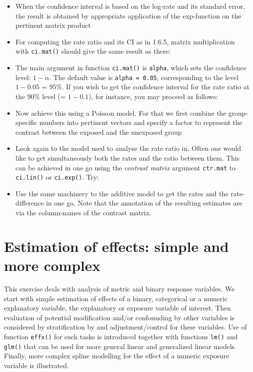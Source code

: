 \documentclass[
]{book}
\begin{document}
\begin{itemize}
\item
  When the confidence interval is based on the log-rate and its
  standard error, the result is obtained by appropriate application of
  the exp-function on the pertinent matrix product
\item
  For computing the rate ratio and its CI as in 1.6.5, matrix
  multiplication with \texttt{ci.mat()} should give the same result as
  there:
\item
  The main argument in function \texttt{ci.mat()} is \texttt{alpha},
  which sets the confidence level: \(1 - \alpha\). The default value is
  \texttt{alpha\ =\ 0.05}, corresponding to the level \(1 - 0.05\) = 95\%.
  If you wish to get the confidence interval for the rate ratio at
  the 90\% level (= \(1-0.1\)), for instance, you may proceed as
  follows:
\item
  Now achieve this using a Poisson model. For that we first combine
  the group-specific numbers into pertinent vectors and specify a factor to represent the contrast between the exposed and the unexposed group
\item
  Look again to the model used to analyse the rate ratio in. Often one would like to get simultaneously both
  the rates and the ratio between them. This can be achieved in one go
  using the \emph{contrast matrix} argument \texttt{ctr.mat} to
  \texttt{ci.lin()} or \texttt{ci.exp()}. Try:
\item
  Use the same machinery to the additive model to get the rates
  and the rate-difference in one go. Note that the annotation of the
  resulting estimates are via the column-names of the contrast matrix.
\end{itemize}

\chapter{Estimation of effects: simple and more complex}\label{estimation-of-effects-simple-and-more-complex}

This exercise deals with analysis of metric and binary
response variables.
We start with simple estimation of effects of a binary, categorical or
a numeric explanatory variable, the explanatory or exposure variable of interest.
Then evaluation of potential modification and/or confounding by other variables
is considered by stratification by and adjustment/control for these variables.
Use of function \texttt{effx()} for such tasks is introduced together
with functions \texttt{lm()} and \texttt{glm()} that can be used for more
general linear and generalized linear models. Finally, more complex
spline modelling for the effect of a numeric exposure variable is
illustrated.
\end{document}
